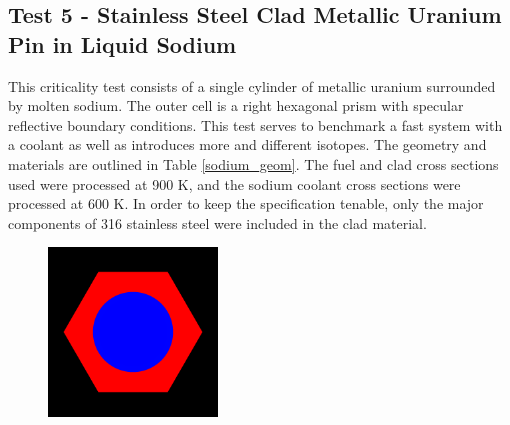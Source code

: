 \documentclass[preprint,12pt]{elsarticle}
\begin{document}
\newpage
\subsection{Test 5 - Stainless Steel Clad Metallic Uranium Pin in Liquid Sodium}

This criticality test consists of a single cylinder of metallic uranium surrounded by molten sodium.  The outer cell is a right hexagonal prism with specular reflective boundary conditions.  This test serves to benchmark a fast system with a coolant as well as introduces more and different isotopes.  The geometry and materials are outlined in Table \ref{sodium_geom}.  The fuel and clad cross sections used were processed at 900 K, and the sodium coolant cross sections were processed at 600 K.  In order to keep the specification tenable, only the major components of 316 stainless steel were included in the clad material. 

\begin{figure}[h!] 
  \centering
    \includegraphics[width=0.4\textwidth]{graphics/sodiumpin-xy.png}
     \caption{  \label{sodiumpin_geom_pic} }
\end{figure}
\end{document}
